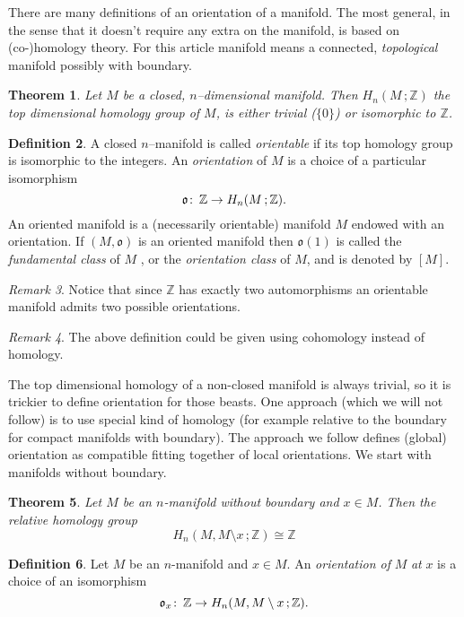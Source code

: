 \documentclass[12pt]{article}
\newtheorem{thm}{Theorem}
\theoremstyle{definition}
\newtheorem{defn}[thm]{Definition}
\theoremstyle{remark}
\newtheorem{rem}[thm]{Remark}
\numberwithin{equation}{subsection}
\def\co{\colon\thinspace}
\begin{document}
There are many definitions of an orientation of a manifold. The most
general, in the sense that it doesn't require any extra
 on the manifold, is based on
(co-)homology theory. For this article manifold means a connected,
{\em topological} manifold possibly with boundary.
\begin{thm} Let $M$ be a closed, $n$--dimensional
  \emph{manifold}. Then $H_n(M\,;\mathbb{Z})$ the top dimensional
  homology group of $M$, is either trivial ($\{0\}$) or isomorphic
  to $ \mathbb{Z}$.
\end{thm}

\begin{defn} A closed  $n$--manifold is called \emph{orientable} if its top
 homology group is isomorphic to the integers.
  An \emph{orientation} of  $M$ is a choice of a particular isomorphism
   $$\mathfrak{o}\co \mathbb{Z} \to H_n(M\,;\mathbb{Z}).$$
An oriented manifold is a (necessarily orientable) manifold $M$ endowed with 
an orientation. 
If $(M,\mathfrak{o})$ is an oriented manifold then  $\mathfrak{o}(1)$ is called
the \emph{fundamental class} of $M$ , or the \emph{orientation class} of $M$, and is denoted
 by $[M]$.
\end{defn}

\begin{rem} Notice that since $\mathbb{Z}$ has exactly two
  automorphisms an orientable manifold admits two possible
  orientations.
\end{rem}

\begin{rem} The above definition could be given using cohomology instead of homology. 
\end{rem}

The top dimensional homology of a non-closed manifold is always
trivial, so it is trickier to define orientation for those
beasts. One approach (which we will not follow) is to use special
kind of homology (for example relative to the boundary for compact
manifolds with boundary). The approach we follow defines (global)
orientation as compatible fitting together of local orientations. We
start with manifolds without boundary.

\begin{thm}Let $M$ be an $n$-manifold without boundary and $x\in
  M$. Then the relative homology group
          $$H_n(M,M\setminus x\,;\mathbb{Z}) \cong \mathbb{Z}$$
\end{thm}
\begin{defn} Let $M$ be an $n$-manifold and $x\in M$. An  {\em orientation 
of} $M$  {\em at} $x$  is a choice of an isomorphism 
 $$\mathfrak{o}_x \co \mathbb{Z} \to H_n(M,M\setminus x\,;\mathbb{Z}).$$
  \end{defn}
\end{document}
